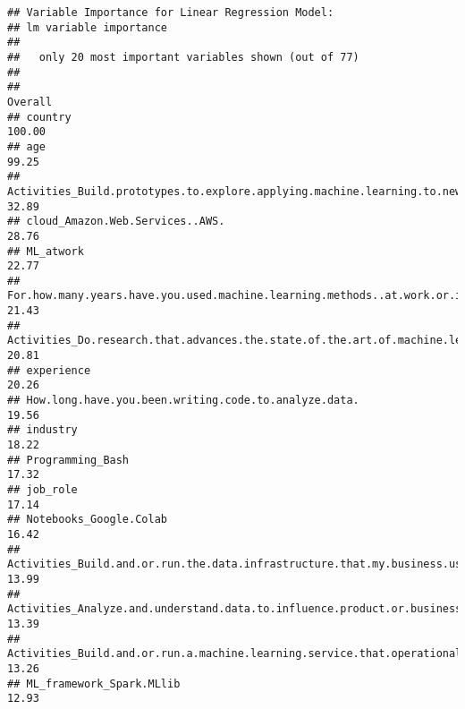 \documentclass[
]{article}
\begin{document}
\begin{verbatim}
## Variable Importance for Linear Regression Model:
## lm variable importance
## 
##   only 20 most important variables shown (out of 77)
## 
##                                                                                                                             Overall
## country                                                                                                                      100.00
## age                                                                                                                           99.25
## Activities_Build.prototypes.to.explore.applying.machine.learning.to.new.areas                                                 32.89
## cloud_Amazon.Web.Services..AWS.                                                                                               28.76
## ML_atwork                                                                                                                     22.77
## For.how.many.years.have.you.used.machine.learning.methods..at.work.or.in.school..                                             21.43
## Activities_Do.research.that.advances.the.state.of.the.art.of.machine.learning                                                 20.81
## experience                                                                                                                    20.26
## How.long.have.you.been.writing.code.to.analyze.data.                                                                          19.56
## industry                                                                                                                      18.22
## Programming_Bash                                                                                                              17.32
## job_role                                                                                                                      17.14
## Notebooks_Google.Colab                                                                                                        16.42
## Activities_Build.and.or.run.the.data.infrastructure.that.my.business.uses.for.storing..analyzing..and.operationalizing.data   13.99
## Activities_Analyze.and.understand.data.to.influence.product.or.business.decisions                                             13.39
## Activities_Build.and.or.run.a.machine.learning.service.that.operationally.improves.my.product.or.workflows                    13.26
## ML_framework_Spark.MLlib                                                                                                      12.93

\end{verbatim}
\end{document}

